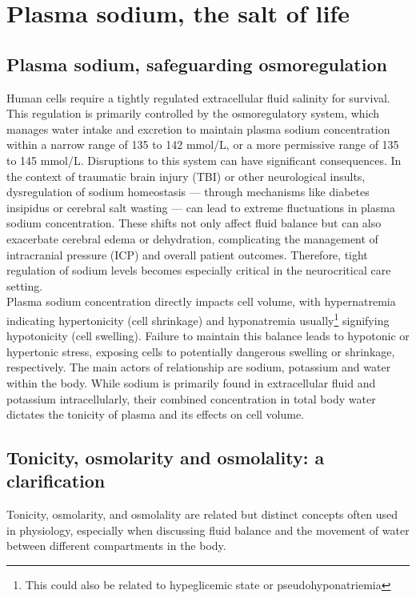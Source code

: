 \chapter{Plasma sodium, the salt of life}

\section{Plasma sodium, safeguarding osmoregulation}

Human cells require a tightly regulated extracellular fluid salinity for survival. This regulation is primarily controlled by the osmoregulatory system, which manages water intake and excretion to maintain plasma sodium concentration within a narrow range of 135 to 142 mmol/L, or a more permissive range of 135 to 145 mmol/L.
Disruptions to this system can have significant consequences. In the context of traumatic brain injury (TBI) or other neurological insults, dysregulation of sodium homeostasis — through mechanisms like diabetes insipidus or cerebral salt wasting — can lead to extreme fluctuations in plasma sodium concentration. These shifts not only affect fluid balance but can also exacerbate cerebral edema or dehydration, complicating the management of intracranial pressure (ICP) and overall patient outcomes. Therefore, tight regulation of sodium levels becomes especially critical in the neurocritical care setting.\\

Plasma sodium concentration directly impacts cell volume, with hypernatremia indicating hypertonicity (cell shrinkage) and hyponatremia usually\footnote {This could also be related to hypeglicemic state or pseudohyponatriemia} signifying hypotonicity (cell swelling). Failure to maintain this balance leads to hypotonic or hypertonic stress, exposing cells to potentially dangerous swelling or shrinkage, respectively. The main actors of relationship are sodium, potassium and water within the body. While sodium is primarily found in extracellular fluid and potassium intracellularly, their combined concentration in total body water dictates the tonicity of plasma and its effects on cell volume.\\

\section{Tonicity, osmolarity and osmolality: a clarification}
Tonicity, osmolarity, and osmolality are related but distinct concepts often used in physiology, especially when discussing fluid balance and the movement of water between different compartments in the body.\\

